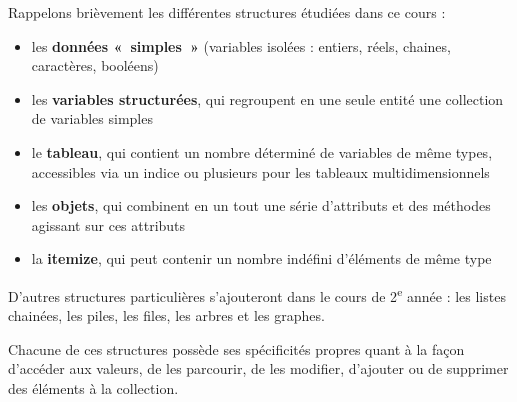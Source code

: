 Rappelons brièvement les différentes structures étudiées dans ce cours
 :

\begin{itemize}
	\item 
		les \textbf{données «~simples~»} (variables isolées : entiers, réels,
		chaines, caractères, booléens)
	\item 
		les \textbf{variables structurées}, qui regroupent en une seule entité
		une collection de variables simples
	\item 
		le \textbf{tableau}, qui contient un nombre déterminé de variables de
		même types, accessibles via un indice ou plusieurs pour les tableaux
		multidimensionnels
	\item 
		les \textbf{objets}, qui combinent en un tout une série d’attributs et
		des méthodes agissant sur ces attributs
	\item 
		la \textbf{itemize}, qui peut contenir un nombre indéfini d’éléments de
		même type
\end{itemize}

D’autres structures particulières s’ajouteront dans le cours de
2\textsuperscript{e} année : les listes chainées, les piles, les
files, les arbres et les graphes.

Chacune de ces structures possède ses spécificités propres quant à la
façon d’accéder aux valeurs, de les parcourir, de les modifier,
d’ajouter ou de supprimer des éléments à la collection. 




